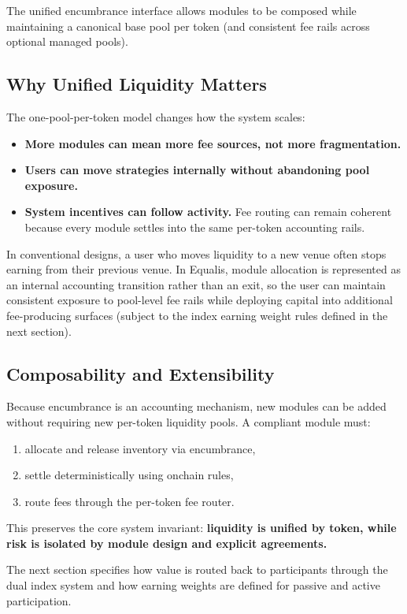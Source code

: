\documentclass[version=preprint]{iacrcc}
\begin{document}
The unified encumbrance interface allows modules to be composed while maintaining a canonical base pool per token (and consistent fee rails across optional managed pools).

\subsection{Why Unified Liquidity Matters}

The one-pool-per-token model changes how the system scales:
\begin{itemize}
  \item \textbf{More modules can mean more fee sources, not more fragmentation.}
  \item \textbf{Users can move strategies internally without abandoning pool exposure.}
  \item \textbf{System incentives can follow activity.} Fee routing can remain coherent because every module settles into the same per-token accounting rails.
\end{itemize}

In conventional designs, a user who moves liquidity to a new venue often stops earning from their previous venue. In Equalis, module allocation is represented as an internal accounting transition rather than an exit, so the user can maintain consistent exposure to pool-level fee rails while deploying capital into additional fee-producing surfaces (subject to the index earning weight rules defined in the next section).

\subsection{Composability and Extensibility}

Because encumbrance is an accounting mechanism, new modules can be added without requiring new per-token liquidity pools. A compliant module must:
\begin{enumerate}
  \item allocate and release inventory via encumbrance,
  \item settle deterministically using onchain rules,
  \item route fees through the per-token fee router.
\end{enumerate}

This preserves the core system invariant: \textbf{liquidity is unified by token, while risk is isolated by module design and explicit agreements.}

The next section specifies how value is routed back to participants through the dual index system and how earning weights are defined for passive and active participation.
\end{document}
